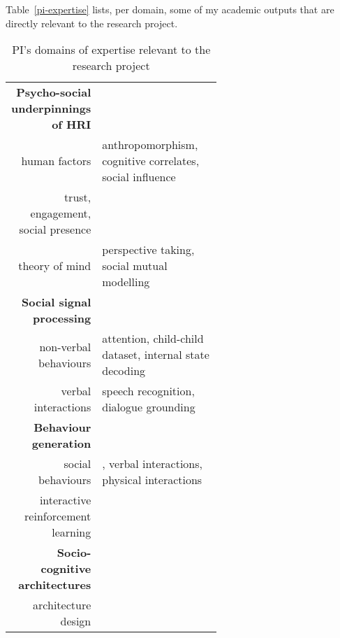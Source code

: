 Table~\ref{pi-expertise} lists, per domain, some of my academic outputs that are
directly relevant to the research project.

\begin{table}[h!]
    \centering
    \caption{\small PI's domains of expertise relevant to the research project}
    \begin{tabular}{rp{0.6\linewidth}}
        \toprule
        \textbf{Psycho-social underpinnings of HRI} \\  
        human factors & \small anthropomorphism\cite{lemaignan2014dynamics}, cognitive
        correlates\cite{lemaignan2014cognitive}, social influence\cite{winkle2019effective} \\
        trust, engagement, social presence & \small \cite{flook2019impact}\cite{lemaignan2015youre}\cite{fink2014which}\cite{irfan2018social}\cite{wijnen2020performing} \\
        theory of mind & \small perspective taking\cite{ros2010which, warnier2012when}, social mutual modelling\cite{lemaignan2015mutual,dillenbourg2016symmetry} \\
        \midrule
        \textbf{Social signal processing}\\
        non-verbal behaviours & \small attention\cite{lemaignan2016realtime},
        child-child dataset\cite{lemaignan2018pinsoro}, internal state decoding\cite{bartlett2019what} \\
        verbal interactions & \small speech recognition\cite{kennedy2017child}, dialogue grounding\cite{lemaignan2011grounding} \\
        \midrule
        \textbf{Behaviour generation} \\
        social behaviours & \small \cite{lallee2011towards}, verbal interactions\cite{wallbridge2019generating, wallbridge2019towards}, physical interactions\cite{gharbi2013natural} \\
        interactive reinforcement learning & \small
        \cite{senft2017leveraging,senft2017supervised, senft2019teaching,  winkle2020insitu} \\
        \midrule
        \textbf{Socio-cognitive architectures} \\
        architecture design & \small \cite{lemaignan2017artificial, baxter2016cognitive,lemaignan2014challenges,lallee2012towards, mallet2010genom3} \\

\end{tabular}
\end{table}
